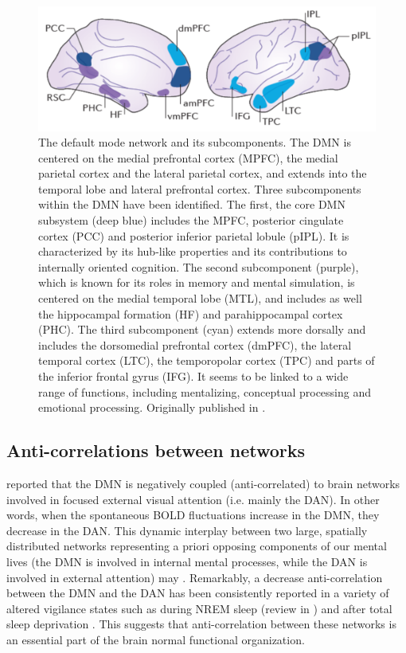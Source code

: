 \begin{figure}[htb]
	\includegraphics[width=\textwidth]{Fig/Methods/fMRI_DMN/Intro_DMN.png}
	\caption[The default mode network and its subcomponents]{The default mode network and its subcomponents. The DMN is centered on the medial prefrontal cortex (MPFC), the medial parietal cortex and the lateral parietal cortex, and extends into the temporal lobe and lateral prefrontal cortex. Three subcomponents within the DMN have been identified. The first, the core DMN subsystem (deep blue) includes the MPFC, posterior cingulate cortex (PCC) and posterior inferior parietal lobule (pIPL). It is characterized by its hub-like properties and its contributions to internally oriented cognition. The second subcomponent (purple), which is known for its roles in memory and mental simulation, is centered on the medial temporal lobe (MTL), and includes as well the hippocampal formation (HF) and parahippocampal cortex (PHC). The third subcomponent (cyan) extends more dorsally and includes the dorsomedial prefrontal cortex (dmPFC), the lateral temporal cortex (LTC), the temporopolar cortex (TPC) and parts of the inferior frontal gyrus (IFG). It seems to be linked to a wide range of functions, including mentalizing, conceptual processing and emotional processing. Originally published in \citet{christoff_mind-wandering_2016}.}
	\label{fig:methods:dmn}
\end{figure}

\subsection{Anti-correlations between networks}
\label{sec:fmri:fc:anti-correl}

\citet{fox_human_2005} reported that the DMN is negatively coupled (anti-correlated) to brain networks involved in focused external visual attention (i.e. mainly the DAN). In other words, when the spontaneous BOLD fluctuations increase in the DMN, they decrease in the DAN. This dynamic interplay between two large, spatially distributed networks representing a priori opposing components of our mental lives (the DMN is involved in internal mental processes, while the DAN is involved in external attention) may  \citep{buckner_opportunities_2013}. Remarkably, a decrease anti-correlation between the DMN and the DAN has been consistently reported in a variety of altered vigilance states such as during NREM sleep (review in \citealp{picchioni_sleep_2013}) and after total sleep deprivation \citep{de_havas_sleep_2012}. This suggests that anti-correlation between these networks is an essential part of the brain normal functional organization.

